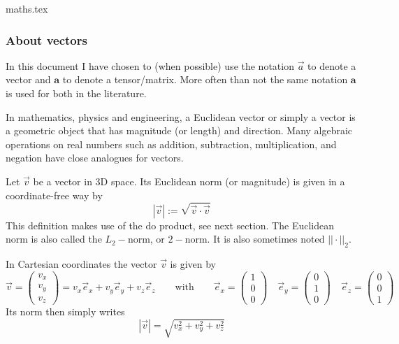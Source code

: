 \begin{flushright} {\tiny {\color{gray} maths.tex}} \end{flushright}

\subsubsection{About vectors}

\begin{remark}
In this document I have chosen to (when possible) use the notation $\vec{a}$
to denote a vector and ${\bm a}$ to denote a tensor/matrix. More often than not 
the same notation ${\bm a}$ is used for both in the literature.
\end{remark}

In mathematics, physics and engineering, a Euclidean vector or simply a vector 
is a geometric object that has magnitude (or length) and direction. 
Many algebraic operations on real numbers such as addition, subtraction, multiplication, 
and negation have close analogues for vectors.

Let $\vec{v}$ be a vector in 3D space. 
Its Euclidean norm (or magnitude) is given in a coordinate-free way by 
\[
|\vec{v}|:=\sqrt{\vec{v}\cdot\vec{v}}
\]
This definition makes use of the do product, see next section.
The Euclidean norm is also called the $L_2-$norm, or $2-$norm. It is also 
sometimes noted $||\cdot ||_2$. 

In Cartesian coordinates the vector $\vec{v}$ is given by
\[
\vec{v}=
\left(
\begin{array}{c}
v_x \\ v_y \\ v_z
\end{array}
\right)
=
v_x \vec{e}_x + 
v_y \vec{e}_y + 
v_z \vec{e}_z 
\qquad
\text{with}
\qquad
\vec{e}_x=
\left(
\begin{array}{c}
1 \\ 0 \\ 0
\end{array}
\right)
\quad
\vec{e}_y=
\left(
\begin{array}{c}
0 \\ 1 \\ 0
\end{array}
\right)
\quad
\vec{e}_z=
\left(
\begin{array}{c}
0 \\ 0 \\ 1
\end{array}
\right)
\]
Its norm then simply writes
\[
|\vec{v}| = \sqrt{v_x^2 + v_y^2 + v_z^2}
\]

